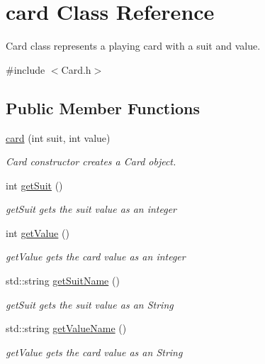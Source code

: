 \hypertarget{classcard}{}\section{card Class Reference}
\label{classcard}


Card class represents a playing card with a suit and value.  




{\ttfamily \#include $<$Card.\+h$>$}

\subsection*{Public Member Functions}
\begin{DoxyCompactItemize}
\item 
\hyperlink{classcard_acfb86f1ab0161ad4445c6d08c2aa5bb5}{card} (int suit, int value)
\begin{DoxyCompactList}\small\item\em Card constructor creates a Card object. \end{DoxyCompactList}\item 
int \hyperlink{classcard_a952559b02cf7d0c468fb4d89e145ad48}{get\+Suit} ()
\begin{DoxyCompactList}\small\item\em get\+Suit gets the suit value as an integer \end{DoxyCompactList}\item 
int \hyperlink{classcard_a5cf12898a17ff2eda5469eaf857e286d}{get\+Value} ()
\begin{DoxyCompactList}\small\item\em get\+Value gets the card value as an integer \end{DoxyCompactList}\item 
std\+::string \hyperlink{classcard_a1038b6c4a093a84ccdea7e3b191dcadd}{get\+Suit\+Name} ()
\begin{DoxyCompactList}\small\item\em get\+Suit gets the suit value as an String \end{DoxyCompactList}\item 
std\+::string \hyperlink{classcard_a1fb74af5bd396a5b721adedf3f04af17}{get\+Value\+Name} ()
\begin{DoxyCompactList}\small\item\em get\+Value gets the card value as an String \end{DoxyCompactList}\end{DoxyCompactItemize}
